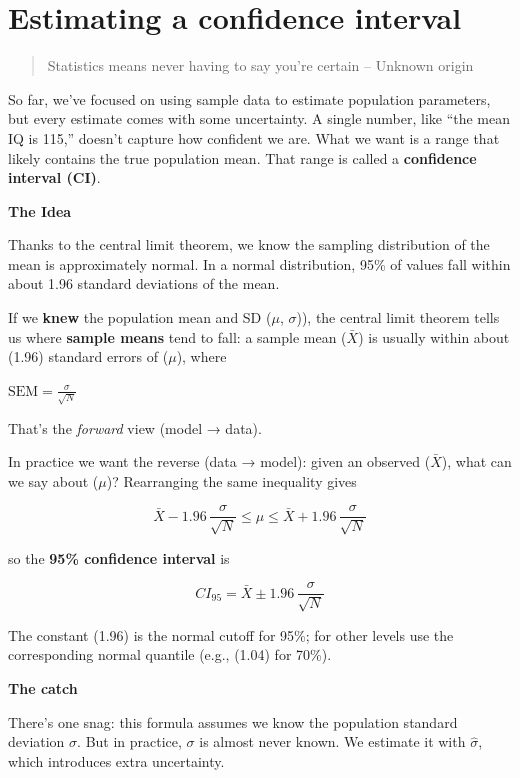 \documentclass[
  letterpaper,
  DIV=11,
  numbers=noendperiod]{scrreprt}
\begin{document}
\section{Estimating a confidence
interval}\label{estimating-a-confidence-interval}

\begin{quote}
Statistics means never having to say you're certain -- Unknown origin
\end{quote}

So far, we've focused on using sample data to estimate population
parameters, but every estimate comes with some uncertainty. A single
number, like ``the mean IQ is 115,'' doesn't capture how confident we
are. What we want is a range that likely contains the true population
mean. That range is called a \textbf{confidence interval (CI)}.

\textbf{The Idea}

Thanks to the central limit theorem, we know the sampling distribution
of the mean is approximately normal. In a normal distribution, 95\% of
values fall within about 1.96 standard deviations of the mean.

If we \textbf{knew} the population mean and SD (\(\mu\), \(\sigma\))),
the central limit theorem tells us where \textbf{sample means} tend to
fall: a sample mean (\(\bar X\)) is usually within about (1.96) standard
errors of (\(\mu\)), where

\(\text{SEM}=\frac{\sigma}{\sqrt{N}}\)

That's the \emph{forward} view (model → data).

In practice we want the reverse (data → model): given an observed
(\(\bar X\)), what can we say about (\(\mu\))? Rearranging the same
inequality gives

\[
\bar{X} - 1.96\,\frac{\sigma}{\sqrt{N}} \le \mu \le \bar{X} + 1.96\,\frac{\sigma}{\sqrt{N}}
\]

so the \textbf{95\% confidence interval} is

\[
CI_{95} = \bar{X} \pm 1.96\,\frac{\sigma}{\sqrt{N}}
\]

The constant (1.96) is the normal cutoff for 95\%; for other levels use
the corresponding normal quantile (e.g., (1.04) for 70\%).

\textbf{The catch}

There's one snag: this formula assumes we know the population standard
deviation \(\sigma\). But in practice, \(\sigma\) is almost never known.
We estimate it with \(\hat\sigma\), which introduces extra uncertainty.
\end{document}
